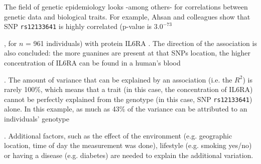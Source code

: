 The field of genetic epidemiology looks -among others- for
correlations between genetic data and biological traits.
For example, Ahsan and colleagues show that
SNP \verb|rs12133641| is highly correlated (p-value is $3.0^{-73}$

,
for $n$ = 961 individuals) with protein IL6RA \cite{ahsan2017relative}.
The direction of the association is also concluded:
the more guanines are present at that SNPs location,
the higher concentration of IL6RA can be found in a human's blood

. The amount of variance that can be explained by an association (i.e.
the \begin{math}R^2\end{math}) is rarely 100\%, which means that a trait (in
this case, the concentration of IL6RA) cannot be perfectly explained
from the genotype (in this case, SNP \verb|rs12133641|) alone. 
In this example, as much as 43\% of the variance 
can be attributed to an individuals' genotype

. Additional factors, 
such as the effect
of the environment (e.g. geographic location, time of day the measurement 
was done), lifestyle (e.g. smoking yes/no) or having a disease (e.g. diabetes) 
are needed to explain the additional variation.


